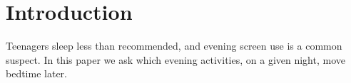 \section{Introduction}
Teenagers sleep less than recommended, and evening screen use is a common suspect.
In this paper we ask which evening activities, on a given night, move bedtime later.
